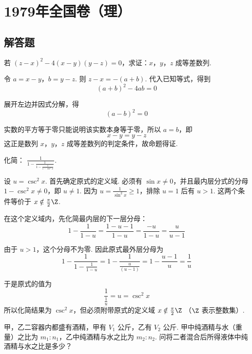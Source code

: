 \documentclass[UTF8,a4paper,oneside,11pt]{ctexbook}
\begin{document}
\mainmatter

\chapter{1979年全国卷（理）}
\section{解答题}

\begin{problem}
若 \(\left(z-x\right)^2-4\left(x-y\right)\left(y-z\right)=0\)，求证：\(x\)，\(y\)，\(z\) 成等差数列.
\end{problem}

\begin{solution}
令 \(a=x-y\)，\(b=y-z\).
则 \(z-x=-(a+b)\).
代入已知等式，得到
\[
(a+b)^2-4ab=0
\]

展开左边并因式分解，得
\[
 (a-b)^2=0
\]

实数的平方等于零只能说明该实数本身等于零，所以
\(
a=b
\)，即
\[
x-y=y-z
\]
这正是数列 \(x\)，\(y\)，\(z\) 成等差数列的判定条件，故命题得证.
\end{solution}

\begin{problem}
化简： \(\frac{1}{1-\frac{1}{1-\frac{1}{1-\csc^2 x}}}\).
\end{problem}

\begin{solution}
设 \(u=\csc^2x\).
首先确定原式的定义域. 必须有 \(\sin x\ne0\)，并且最内层分式的分母
\(1-\csc^2x\ne0\)，即 \(u\ne1\). 因为 \(u=\frac{1}{\sin^2x}\geq1\)，排除 \(u=1\) 后有 \(u>1\). 这两个条件等价于
\(x\notin\frac{\pi}{2}\Z\).

在这个定义域内，先化简最内层的下一层分母：
\[
1-\frac{1}{1-u}=\frac{1-u-1}{1-u}=\frac{-u}{1-u}=\frac{u}{u-1}
\]

由于 \(u>1\)，这个分母不为零. 因此原式最外层分母为
\[
1-\frac{1}{1-\frac{1}{1-u}}
=1-\frac{1}{\frac{u}{(u-1)}}
=1-\frac{u-1}{u}
=\frac{1}{u}
\]

于是原式的值为
\[
\frac{1}{\frac{1}{u}}=u=\csc^2x
\]
所以化简结果为 \(\csc^2x\)，但必须附带原式的定义域
\(
x\notin\frac{\pi}{2}\Z
\)
（\(\Z\) 表示整数集）.
\end{solution}

\begin{problem}
甲，乙二容器内都盛有酒精，甲有 \(V_{1}\text{ 公斤}\)，乙有 \(V_{2}\text{ 公斤}\). 甲中纯酒精与水（重量）之比为 \(m_{1}:n_{1}\)，乙中纯酒精与水之比为 \(m_{2}:n_{2}\). 问将二者混合后所得液体中纯酒精与水之比是多少？
\end{problem}
\end{document}
